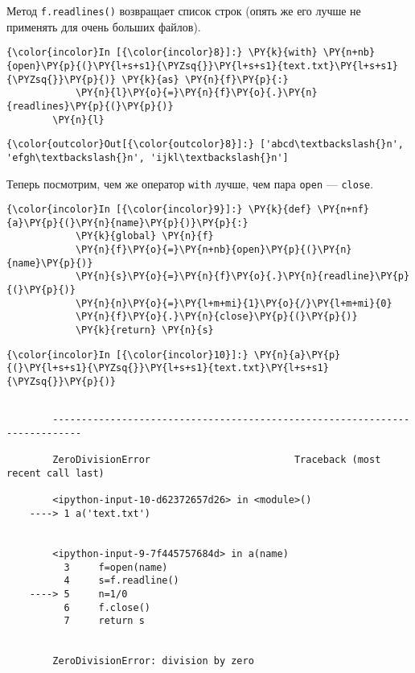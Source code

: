     Метод \texttt{f.readlines()} возвращает список строк (опять же его лучше
не применять для очень больших файлов).

    \begin{Verbatim}[commandchars=\\\{\}]
{\color{incolor}In [{\color{incolor}8}]:} \PY{k}{with} \PY{n+nb}{open}\PY{p}{(}\PY{l+s+s1}{\PYZsq{}}\PY{l+s+s1}{text.txt}\PY{l+s+s1}{\PYZsq{}}\PY{p}{)} \PY{k}{as} \PY{n}{f}\PY{p}{:}
            \PY{n}{l}\PY{o}{=}\PY{n}{f}\PY{o}{.}\PY{n}{readlines}\PY{p}{(}\PY{p}{)}
        \PY{n}{l}
\end{Verbatim}

            \begin{Verbatim}[commandchars=\\\{\}]
{\color{outcolor}Out[{\color{outcolor}8}]:} ['abcd\textbackslash{}n', 'efgh\textbackslash{}n', 'ijkl\textbackslash{}n']
\end{Verbatim}
        
    Теперь посмотрим, чем же оператор \texttt{with} лучше, чем пара
\texttt{open} --- \texttt{close}.

    \begin{Verbatim}[commandchars=\\\{\}]
{\color{incolor}In [{\color{incolor}9}]:} \PY{k}{def} \PY{n+nf}{a}\PY{p}{(}\PY{n}{name}\PY{p}{)}\PY{p}{:}
            \PY{k}{global} \PY{n}{f}
            \PY{n}{f}\PY{o}{=}\PY{n+nb}{open}\PY{p}{(}\PY{n}{name}\PY{p}{)}
            \PY{n}{s}\PY{o}{=}\PY{n}{f}\PY{o}{.}\PY{n}{readline}\PY{p}{(}\PY{p}{)}
            \PY{n}{n}\PY{o}{=}\PY{l+m+mi}{1}\PY{o}{/}\PY{l+m+mi}{0}
            \PY{n}{f}\PY{o}{.}\PY{n}{close}\PY{p}{(}\PY{p}{)}
            \PY{k}{return} \PY{n}{s}
\end{Verbatim}

    \begin{Verbatim}[commandchars=\\\{\}]
{\color{incolor}In [{\color{incolor}10}]:} \PY{n}{a}\PY{p}{(}\PY{l+s+s1}{\PYZsq{}}\PY{l+s+s1}{text.txt}\PY{l+s+s1}{\PYZsq{}}\PY{p}{)}
\end{Verbatim}

    \begin{Verbatim}[commandchars=\\\{\}]

        ---------------------------------------------------------------------------

        ZeroDivisionError                         Traceback (most recent call last)

        <ipython-input-10-d62372657d26> in <module>()
    ----> 1 a('text.txt')
    

        <ipython-input-9-7f445757684d> in a(name)
          3     f=open(name)
          4     s=f.readline()
    ----> 5     n=1/0
          6     f.close()
          7     return s


        ZeroDivisionError: division by zero

    \end{Verbatim}

